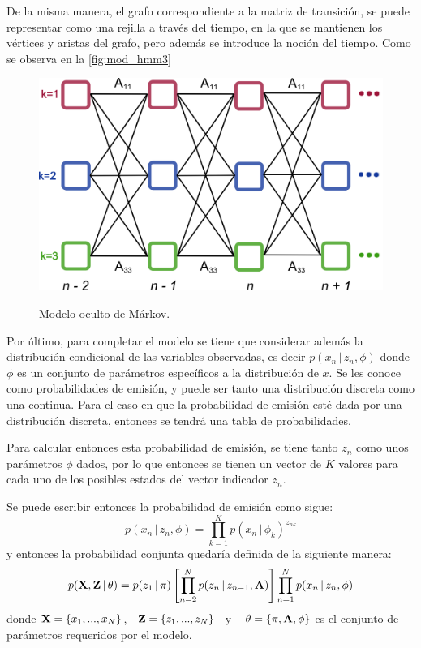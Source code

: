 De la misma manera, el grafo correspondiente a la matriz de transición, se puede representar como una rejilla a través del tiempo, en la que se mantienen los vértices y aristas del grafo, pero además se introduce la noción del tiempo. Como se observa en la \autoref{fig:mod_hmm3} 

\begin{figure}[hbt]
        \myfloatalign
        {\includegraphics[width=0.63\linewidth]{gfx/chap2/mod-hmm3}}
        \caption{Modelo oculto de Márkov.}
        \label{fig:mod_hmm3}
\end{figure}

Por último, para completar el modelo se tiene que considerar además la distribución condicional de las variables observadas, es decir $p(x_n \,|\, z_n, \phi)$ donde $\phi$ es un conjunto de parámetros específicos a la distribución de $x$. Se les conoce como probabilidades de emisión, y puede ser tanto una distribución discreta como una continua. Para el caso en que la probabilidad de emisión esté dada por una distribución discreta, entonces se tendrá una tabla de probabilidades.

Para calcular entonces esta probabilidad de emisión, se tiene tanto $z_n$ como unos parámetros $\phi$ dados, por lo que entonces se tienen un vector de $K$ valores para cada uno de los posibles estados del vector indicador $z_n$.

Se puede escribir entonces la probabilidad de emisión como sigue:
\begin{equation}
p(x_n \,|\, z_n, \phi) = \prod_{k=1}^K p(x_n \,|\, \phi_k) ^ {z_{nk}}
\label{eqn:2-10}
\end{equation}
y entonces la probabilidad conjunta quedaría definida de la siguiente manera:
\begin{equation}
p(\textbf{X}, \textbf{Z} \,|\, \theta) 
= p(z_1 \,|\, \pi) \left[ \prod_{n=2}^N p(z_n \,|\, z_{n-1}, \textbf{A}) \right]
        \prod_{n=1}^N p(x_n \,|\, z_n, \phi)
\label{eqn:2-11}
\end{equation}
donde $\textbf{X} = \lbrace x_1, ..., x_N \rbrace$,~ $\textbf{Z} = \lbrace z_1, ..., z_N \rbrace$~ y ~ $\theta = \lbrace \pi, \textbf{A}, \phi \rbrace$ es el conjunto de parámetros requeridos por el modelo.

